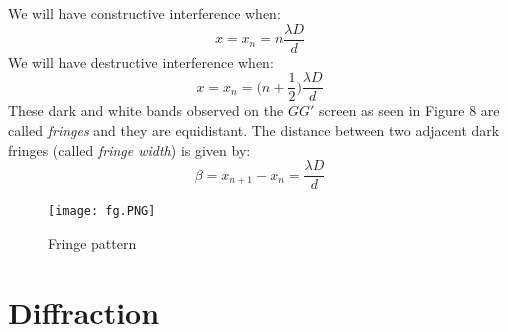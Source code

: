 \documentclass{article}
\begin{document}
We will have constructive interference when:
\begin{equation*}
    x = x_{n} = n \frac{\lambda D}{d}
\end{equation*}
We will have destructive interference when:
\begin{equation*}
    x = x_{n} = \bigg( n + \frac{1}{2} \bigg) \frac{\lambda D}{d}
\end{equation*}
\newpage
These dark and white bands  observed on the $GG'$ screen as seen in Figure 8 are called \emph{fringes} and they are equidistant. The distance between two adjacent dark fringes (called \emph{fringe width}) is given by:
\begin{equation*}
    \beta = x_{n+1} - x_{n}  = \frac{\lambda D}{d}
\end{equation*}
\begin{figure}[htp]
    \centering
    \texttt{[image: fg.PNG]}
    \caption{Fringe pattern}
    \label{fig:y equals x}
\end{figure}
\section{Diffraction}
\end{document}
